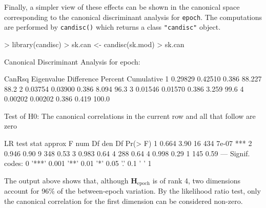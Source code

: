 \documentclass[11pt]{article}
\newcommand{\mat}[1]{\ensuremath{\bm{#1}}}
\newcommand{\code}[1]{{\texttt{#1}}}
\newcommand{\func}[1]{{\texttt{#1()}}}
\begin{document}
Finally, a simpler view of these effects can be shown in the canonical
space corresponding to the canonical discriminant analysis for
\code{epoch}.  The computations are performed by \func{candisc}
which returns a class \code{"candisc"} object.

\begin{Schunk}
\begin{Sinput}
> library(candisc)
> sk.can <- candisc(sk.mod)
> sk.can
\end{Sinput}
\begin{Soutput}
Canonical Discriminant Analysis for epoch:

   CanRsq Eigenvalue Difference Percent Cumulative
1 0.29829    0.42510      0.386  88.227       88.2
2 0.03754    0.03900      0.386   8.094       96.3
3 0.01546    0.01570      0.386   3.259       99.6
4 0.00202    0.00202      0.386   0.419      100.0

Test of H0: The canonical correlations in the 
current row and all that follow are zero

  LR test stat approx F num Df den Df Pr(> F)    
1        0.664     3.90     16    434   7e-07 ***
2        0.946     0.90      9    348    0.53    
3        0.983     0.64      4    288    0.64    
4        0.998     0.29      1    145    0.59    
---
Signif. codes:  0 '***' 0.001 '**' 0.01 '*' 0.05 '.' 0.1 ' ' 1 
\end{Soutput}
\end{Schunk}
The output above shows that, although $\mat{H}_{\textrm{epoch}}$ is of rank 4,
two dimensions account for 96\% 
of the between-epoch variation.  By the likelihood ratio test, only
the canonical correlation for the first dimension can be considered
non-zero.
\end{document}
